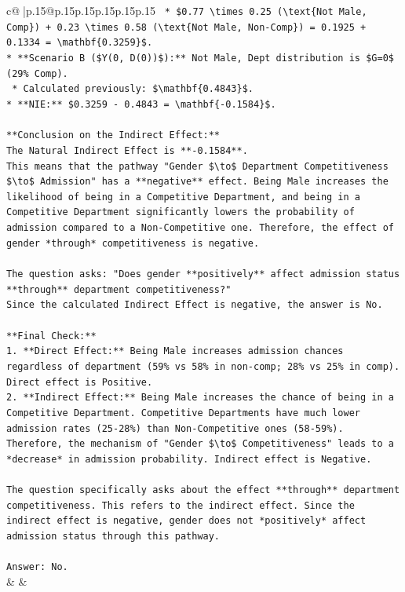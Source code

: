 \documentclass{article}
\begin{document}
{\begin{supertabular}{c@{$\;$}|p{.15\linewidth}@{}p{.15\linewidth}p{.15\linewidth}p{.15\linewidth}p{.15\linewidth}p{.15\linewidth}}
{{{\texttt{    *   \$0.77 \textbackslash{}times 0.25 (\textbackslash{}text\{Not Male, Comp\}) + 0.23 \textbackslash{}times 0.58 (\textbackslash{}text\{Not Male, Non{-}Comp\}) = 0.1925 + 0.1334 = \textbackslash{}mathbf\{0.3259\}\$.} \\
\texttt{*   **Scenario B (\$Y(0, D(0))\$):** Not Male, Dept distribution is \$G=0\$ (29\% Comp).} \\
\texttt{    *   Calculated previously: \$\textbackslash{}mathbf\{0.4843\}\$.} \\
\texttt{*   **NIE:** \$0.3259 {-} 0.4843 = \textbackslash{}mathbf\{{-}0.1584\}\$.} \\
\\ 
\texttt{**Conclusion on the Indirect Effect:**} \\
\texttt{The Natural Indirect Effect is **{-}0.1584**.} \\
\texttt{This means that the pathway "Gender \$\textbackslash{}to\$ Department Competitiveness \$\textbackslash{}to\$ Admission" has a **negative** effect. Being Male increases the likelihood of being in a Competitive Department, and being in a Competitive Department significantly lowers the probability of admission compared to a Non{-}Competitive one. Therefore, the effect of gender *through* competitiveness is negative.} \\
\\ 
\texttt{The question asks: "Does gender **positively** affect admission status **through** department competitiveness?"} \\
\texttt{Since the calculated Indirect Effect is negative, the answer is No.} \\
\\ 
\texttt{**Final Check:**} \\
\texttt{1.  **Direct Effect:** Being Male increases admission chances regardless of department (59\% vs 58\% in non{-}comp; 28\% vs 25\% in comp). Direct effect is Positive.} \\
\texttt{2.  **Indirect Effect:** Being Male increases the chance of being in a Competitive Department. Competitive Departments have much lower admission rates (25{-}28\%) than Non{-}Competitive ones (58{-}59\%). Therefore, the mechanism of "Gender \$\textbackslash{}to\$ Competitiveness" leads to a *decrease* in admission probability. Indirect effect is Negative.} \\
\\ 
\texttt{The question specifically asks about the effect **through** department competitiveness. This refers to the indirect effect. Since the indirect effect is negative, gender does not *positively* affect admission status through this pathway.} \\
\\ 
\texttt{Answer: No.} \\
            }
        }
    }
    & & \\ \\


\end{supertabular}}
\end{document}
